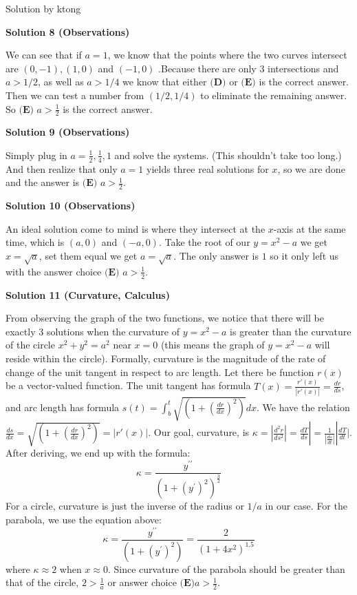 \begin{enumerate}
 Solution by ktong

 



\textbf{Solution 8 (Observations)}

We can see that if $a = 1$, we know that the points where the two curves intersect are $(0, -1), (1, 0)$ and $(-1, 0)$ .Because there are only $3$ intersections and $a > 1/2$, as well as $a > 1/4$ we know that either $\textbf{(D)}$ or $\textbf{(E)}$ is the correct answer. Then we can test a number from $(1/2, 1/4)$ to eliminate the remaining answer. So  $\boxed{\textbf{(E) }a>\frac12}$ is the correct answer. 

 



\textbf{Solution 9 (Observations)}

Simply plug in $a = \frac{1}{2}, \frac{1}{4}, 1$ and solve the systems. (This shouldn't take too long.) And then realize that only $a=1$ yields three real solutions for $x$, so we are done and the answer is $\boxed{\textbf{(E) }a>\frac12}$.

 



\textbf{Solution 10 (Observations)}

An ideal solution come to mind is where they intersect at the $x$-axis at the same time, which is $(a, 0)$ and $(-a, 0).$ Take the root of our $y=x^2-a$ we get $x=\sqrt{a}$, set them equal we get $a=\sqrt{a}.$ The only answer is $1$ so it only left us with the answer choice $\boxed{\textbf{(E) }a>\frac12}$.

 



\textbf{Solution 11 (Curvature, Calculus)}

From observing the graph of the two functions, we notice that there will be exactly 3 solutions when the curvature of $y = x^2-a$ is greater than the curvature of the circle $x^2+y^2 = a^2$ near $x=0$ (this means the graph of $y=x^2-a$ will reside within the circle). Formally, curvature is the magnitude of the rate of change of the unit tangent in respect to arc length. Let there be function $r(x)$ be a vector-valued function. The unit tangent has formula $T(x)=\frac{r'(x)}{|r'(x)|}=\frac{dr}{ds}$, and arc length has formula $s(t)=\int_b^{t}\sqrt{\left( 1+ \left( \frac{dr}{dx} \right) ^2 \right) }dx$. We have the relation $\frac{ds}{dx}=\sqrt{\left( 1+ \left( \frac{dr}{dx} \right) ^2 \right) }=|r'(x)|$. Our goal, curvature, is $\kappa= \left| \frac{d^2r}{ds^2} \right| =\frac{dT}{ds}|=\frac1{|\frac{ds}{dt}|}|\frac{dT}{dt}|$. After deriving, we end up with the formula:
 \[\kappa = \frac{y^{\prime\prime}}{(1+(y^{\prime})^2)^\frac{3}{2}}\]For a circle, curvature is just the inverse of the radius or $1/a$ in our case. For the parabola, we use the equation above:
 \[\kappa = \frac{y^{\prime\prime}}{(1+(y^{\prime})^2)} = \frac{2}{(1+4x^2)^{1.5}}\]where $\kappa \approx 2$ when $x \approx 0$. Since curvature of the parabola should be greater than that of the circle, $2>\frac{1}{a}$ or answer choice $\boxed{\textbf{(E)}a>\frac12}$.


\end{enumerate}
